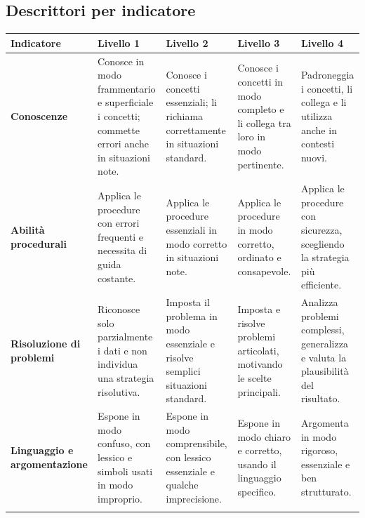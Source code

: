 \documentclass[11pt,a4paper]{article}
\begin{document}
\begin{landscape}
\section*{Descrittori per indicatore}
\small
\begin{longtable}{@{}p{2.3cm}p{4.3cm}p{4.3cm}p{4.3cm}p{4.3cm}@{}}
\toprule
\textbf{Indicatore} & \textbf{Livello 1} & \textbf{Livello 2} & \textbf{Livello 3} & \textbf{Livello 4} \\
\midrule
\endhead

\textbf{Conoscenze} & Conosce in modo frammentario e superficiale i concetti; commette errori anche in situazioni note. & Conosce i concetti essenziali; li richiama correttamente in situazioni standard. & Conosce i concetti in modo completo e li collega tra loro in modo pertinente. & Padroneggia i concetti, li collega e li utilizza anche in contesti nuovi. \\
\addlinespace

\textbf{Abilità procedurali} & Applica le procedure con errori frequenti e necessita di guida costante. & Applica le procedure essenziali in modo corretto in situazioni note. & Applica le procedure in modo corretto, ordinato e consapevole. & Applica le procedure con sicurezza, scegliendo la strategia più efficiente. \\
\addlinespace

\textbf{Risoluzione di problemi} & Riconosce solo parzialmente i dati e non individua una strategia risolutiva. & Imposta il problema in modo essenziale e risolve semplici situazioni standard. & Imposta e risolve problemi articolati, motivando le scelte principali. & Analizza problemi complessi, generalizza e valuta la plausibilità del risultato. \\
\addlinespace

\textbf{Linguaggio e argomentazione} & Espone in modo confuso, con lessico e simboli usati in modo improprio. & Espone in modo comprensibile, con lessico essenziale e qualche imprecisione. & Espone in modo chiaro e corretto, usando il linguaggio specifico. & Argomenta in modo rigoroso, essenziale e ben strutturato. \\
\addlinespace

\bottomrule
\end{longtable}
\end{landscape}
\end{document}
